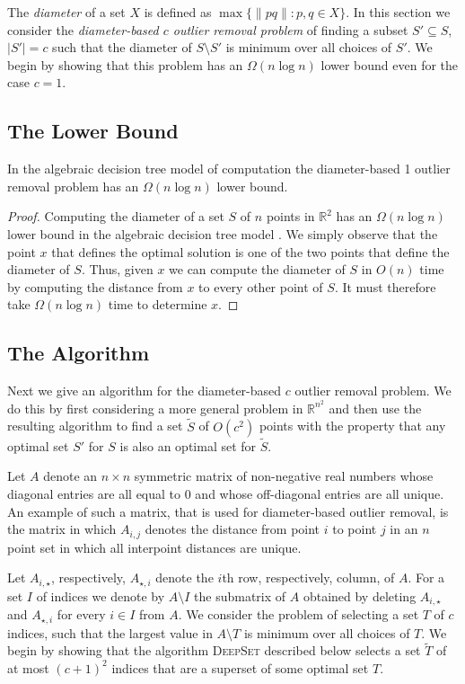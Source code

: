 \documentclass{elsart}
\begin{document}
The \emph{diameter} of a set $X$ is defined as $\max\{\|pq\|:p,q\in
X\}$.  In this section we consider the \emph{diameter-based $c$ outlier
removal problem} of finding a subset $S'\subseteq S$, $|S'|=c$ such
that the diameter of $S\setminus S'$ is minimum over all choices of
$S'$.  We begin by showing that this problem has an $\Omega(n\log n)$
lower bound even for the case $c=1$.

\subsection{The Lower Bound}

\begin{thm}
In the algebraic decision tree model of computation the diameter-based
1 outlier removal problem has 
an $\Omega(n\log n)$ lower bound.
\end{thm}

\begin{proof}
Computing the diameter of a set $S$ of $n$ points in $\mathbb{R}^2$
has an $\Omega(n\log n)$ lower bound in the algebraic decision tree
model \cite{ps85}.  We simply observe that the point $x$ that defines
the optimal solution is one of the two points that define the diameter
of $S$. Thus, given $x$ we can compute the diameter of $S$ in $O(n)$
time by computing the distance from $x$ to every other point of $S$.
It must therefore take $\Omega(n\log n)$ time to determine $x$. 
\end{proof}


\subsection{The Algorithm}

Next we give an algorithm for the diameter-based $c$ outlier removal
problem.  We do this by first considering a more general problem in
$\mathbb{R}^{n^2}$ and then use the resulting algorithm to find
a set $\tilde{S}$ of $O(c^2)$ points with the property that any
optimal set $S'$ for $S$ is also an optimal set for $\tilde{S}$. 

Let $A$ denote an $n\times n$ symmetric matrix of non-negative real
numbers whose diagonal entries are all equal to 0 and whose
off-diagonal entries are all unique.  An example of such a matrix,
that is used for diameter-based outlier removal, is the matrix in
which $A_{i,j}$ denotes the distance from point $i$ to point $j$ in an
$n$ point set in which all interpoint distances are unique.

Let $A_{i,\star}$, respectively,
$A_{\star,i}$ denote the $i$th row, respectively, column, of $A$.  For
a set $I$ of indices we denote by $A\setminus I$ the submatrix of $A$
obtained by deleting $A_{i,\star}$ and $A_{\star,i}$ for every $i\in
I$ from $A$.  We consider the problem of selecting a set $T$ of $c$
indices, such that the largest value in $A\setminus T$ is minimum over
all choices of $T$.  We begin by showing that the algorithm
\textsc{DeepSet} described below selects a set $\tilde{T}$ of
at most $(c+1)^2$ indices that are a superset of some optimal set $T$.
\end{document}
